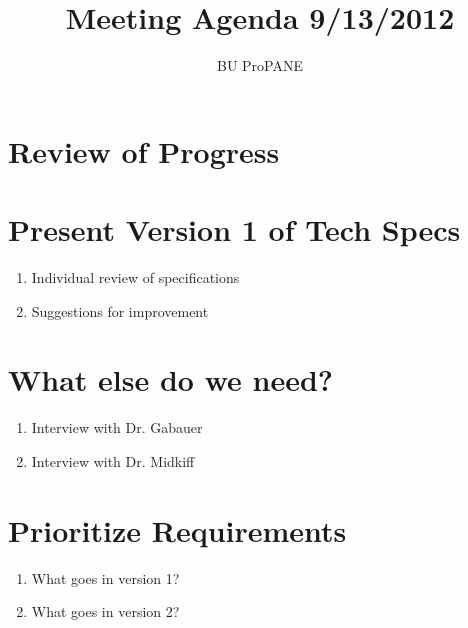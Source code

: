\documentclass[]{article}
\begin{document}
\title{Meeting Agenda 9/13/2012}
\date{}
\author{BU ProPANE}
\maketitle
	
	\thispagestyle{empty}
	\section{Review of Progress}

	\section{Present Version 1 of Tech Specs}
		\begin{enumerate}
			\item Individual review of specifications
			\item Suggestions for improvement
		\end{enumerate}
		
	\section{What else do we need?}
		\begin{enumerate}
			\item Interview with Dr. Gabauer
			\item Interview with Dr. Midkiff
		\end{enumerate}
			
	\section{Prioritize Requirements}
		\begin{enumerate}
			\item What goes in version 1?
			\item What goes in version 2?
		\end{enumerate}
	
		
\end{document}
